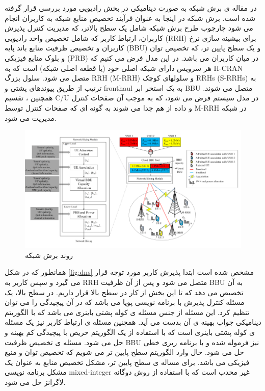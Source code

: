 در مقاله ی \cite{lee2018dynamic}
برش شبکه به صورت دینامیکی در بخش رادیویی مورد بررسی قرار گرفته شده است.
برش شبکه در اینجا به عنوان فرآیند تخصیص منابع شبکه به کاربران انجام می شود
چارچوب طرح برش شبکه شامل یک سطح بالاتر، که مدیریت کنترل پذیرش کاربران، ارتباط کاربر که شامل تخصیص واحد رادیویی (RRH) برای بیشینه سازی نرخ کاربران و تخصیص ظرفیت منابع باند پایه (‌BBU) و یک سطح پایین تر، که تخصیص توان و بلوک منابع فیزیکی (PRB) در میان کاربران می باشد.
در این مدل فرض می کنیم که هر سرویس دارای شبکه اصلی خود (یا قطعه اصلی شبکه) است که به H-CRAN متصل می شود.
سلول بزرگ RRH (M-RRH) و سلولهای کوچک RRHs (S-RRHs) به ترتیب از طریق پیوندهای پشتی و fronthaul به یک استخر ابر
BBU  متصل می شوند.
همچنین ، تقسیم C/U در مدل سیستم فرض می شود، که به موجب آن صفحات کنترل و داده از هم جدا می شوند به گونه ای که صفحات کنترل توسط M-RRH در شبکه مدیریت می شود.
\begin{figure}%
  \centering
    \includegraphics[scale = 0.7]{./fig/dynamicNS}
  \caption{روند برش شبکه\ \cite{lee2018dynamic}}
  \label{fig:dns}
\end{figure}
همانطور که در شکل \eqref{fig:dns} 
مشخص شده است ابتدا پذیرش کاربر مورد توجه قرار می گیرد و سپس کاربر به RRH متصل می شود و پس از آن ظرفیت BBU به آن تخصیص می دهد که تا این بخش از کار در سطح بالا قرار داریم.
در سطح بالا، یک مسئله کنترل پذیرش با برنامه نویسی پویا می باشد که در آن پیچیدگی را می توان تنظیم کرد.
این مسئله از جنس مسئله ی
کوله پشتی 
باینری
 می باشد که با الگوریتم دینامیکی جواب بهینه ی آن بدست می آید.
همچنین مسئله ی ارتباط کاربر نیز یک مسئله ی کوله پشتی باینری است که با استفاده از یک الگوریتم حریص با پیچیدگی کم بهینه و حل می شود.
 مسئله ی تخصیص ظرفیت BBU نیز فرموله شده و با برنامه ریزی خطی حل می شود.
 حال وارد الگوریتم سطح پایین تر می شویم که تخصیص توان و منبع فیزیکی می باشد.
برای مساله ی سطح پایین تر، مشکل تخصیص منابع به عنوان یک مشکل برنامه نویسی mixed-integer غیر محدب است که با استفاده از روش دوگانه لاگرانژ حل می شود.

